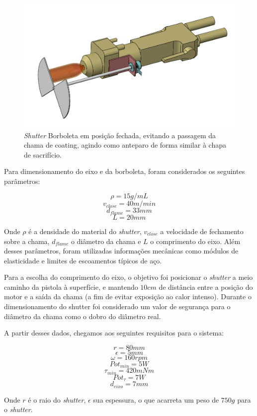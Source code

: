 \begin{figure}[h!]
\centering
	\includegraphics[width=\columnwidth]{figs/estudo/shutter/Shutter_Borboleta_Fechado}
	\caption{\textit{Shutter} Borboleta em posição fechada, evitando a passagem da chama
	de coating, agindo como anteparo de forma similar à chapa de sacrifício.}
	\label{fig::borboleta_fechada}
\end{figure}

Para dimensionamento do eixo e da borboleta, foram considerados os seguintes
parâmetros:

\[\rho = 15 g/mL\]
\[v_{close} = 40 m/min\]
\[d_{flame} = 33mm\]
\[L = 20mm\]

Onde $\rho$ é a densidade do material do \textit{shutter}, $v_{close}$ a
velocidade de fechamento sobre a chama, $d_{flame}$ o diâmetro da chama e $L$ o
comprimento do eixo. Além desses parâmetros, foram utilizadas informações
mecânicas como módulos de elasticidade e limites de escoamentos típicos de aço.

Para a escolha do comprimento do eixo, o objetivo foi posicionar o
\textit{shutter} a meio caminho da pistola à superfície, e mantendo $10cm$ de
distância entre a posição do motor e a saída da chama (a fim de evitar
exposição ao calor intenso). Durante o dimensionamento do shutter foi
considerado um valor de segurança para o diâmetro da chama como o dobro do
diâmetro real.

A partir desses dados, chegamos aos seguintes requisitos para o sistema:

\[ r = 80 mm\]
\[ \epsilon = 5 mm\]
\[ \omega = 160 rpm\]
\[ {Pot}_{min} = 5 W \]
\[ \tau_{min} = 420 mNm \]
\[ Pot_{\tau} = 7 W \]
\[ d_{eixo} = 7 mm\]

Onde $r$ é o raio do \textit{shutter}, $\epsilon$ sua espessura, o que acarreta
um peso de $750 g$ para o \textit{shutter}.


